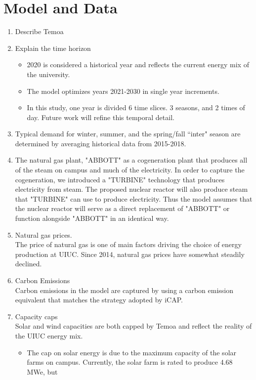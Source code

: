 \section{Model and Data}

\begin{enumerate}
  \item Describe Temoa
  \item Explain the time horizon
  \begin{itemize}
    \item 2020 is considered a historical year and reflects the current energy
    mix of the university.
    \item The model optimizes years 2021-2030 in single year increments.
    \item In this study, one year is divided 6 time slices. 3 seasons, and 2 times
    of day. Future work will refine this temporal detail.
  \end{itemize}
  \item Typical demand for winter, summer, and the spring/fall ``inter" season
  are determined by averaging historical data from 2015-2018.
  \item The natural gas plant, "ABBOTT" as a cogeneration plant that produces
  all of the steam on campus and much of the electricity. In order to capture
  the cogeneration, we introduced a "TURBINE" technology that produces electricity
  from steam. The proposed nuclear reactor will also produce steam that "TURBINE"
  can use to produce electricity. Thus the model assumes that the nuclear reactor
  will serve as a direct replacement of "ABBOTT" or function alongside "ABBOTT"
  in an identical way.
  \item Natural gas prices.\\
  The price of natural gas is one of main factors driving the choice of energy
  production at UIUC. Since 2014, natural gas prices have somewhat steadily declined.
  \item Carbon Emissions \\
  Carbon emissions in the model are captured by using a carbon emission equivalent
  that matches the strategy adopted by iCAP.
  \item Capacity caps\\
  Solar and wind capacities are both capped by Temoa and reflect the reality of
  the UIUC energy mix.
  \begin{itemize}
    \item The cap on solar energy is due to the maximum capacity of the solar
    farms on campus. Currently, the solar farm is rated to produce 4.68 MWe, but

\end{itemize}
\end{enumerate}
